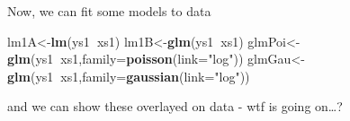 \documentclass[
]{book}
\newenvironment{Shaded}{\begin{snugshade}}{\end{snugshade}}
\newcommand{\DataTypeTok}[1]{\textcolor[rgb]{0.13,0.29,0.53}{#1}}
\newcommand{\KeywordTok}[1]{\textcolor[rgb]{0.13,0.29,0.53}{\textbf{#1}}}
\newcommand{\NormalTok}[1]{#1}
\newcommand{\OperatorTok}[1]{\textcolor[rgb]{0.81,0.36,0.00}{\textbf{#1}}}
\newcommand{\StringTok}[1]{\textcolor[rgb]{0.31,0.60,0.02}{#1}}
\begin{document}
Now, we can fit some models to data

\begin{Shaded}
\begin{Highlighting}[]
\NormalTok{lm1A<-}\KeywordTok{lm}\NormalTok{(ys1}\OperatorTok{~}\NormalTok{xs1)}
\NormalTok{lm1B<-}\KeywordTok{glm}\NormalTok{(ys1}\OperatorTok{~}\NormalTok{xs1)}
\NormalTok{glmPoi<-}\KeywordTok{glm}\NormalTok{(ys1}\OperatorTok{~}\NormalTok{xs1,}\DataTypeTok{family=}\KeywordTok{poisson}\NormalTok{(}\DataTypeTok{link=}\StringTok{"log"}\NormalTok{))}
\NormalTok{glmGau<-}\KeywordTok{glm}\NormalTok{(ys1}\OperatorTok{~}\NormalTok{xs1,}\DataTypeTok{family=}\KeywordTok{gaussian}\NormalTok{(}\DataTypeTok{link=}\StringTok{"log"}\NormalTok{))}
\end{Highlighting}
\end{Shaded}

and we can show these overlayed on data - wtf is going on\ldots?
\end{document}
